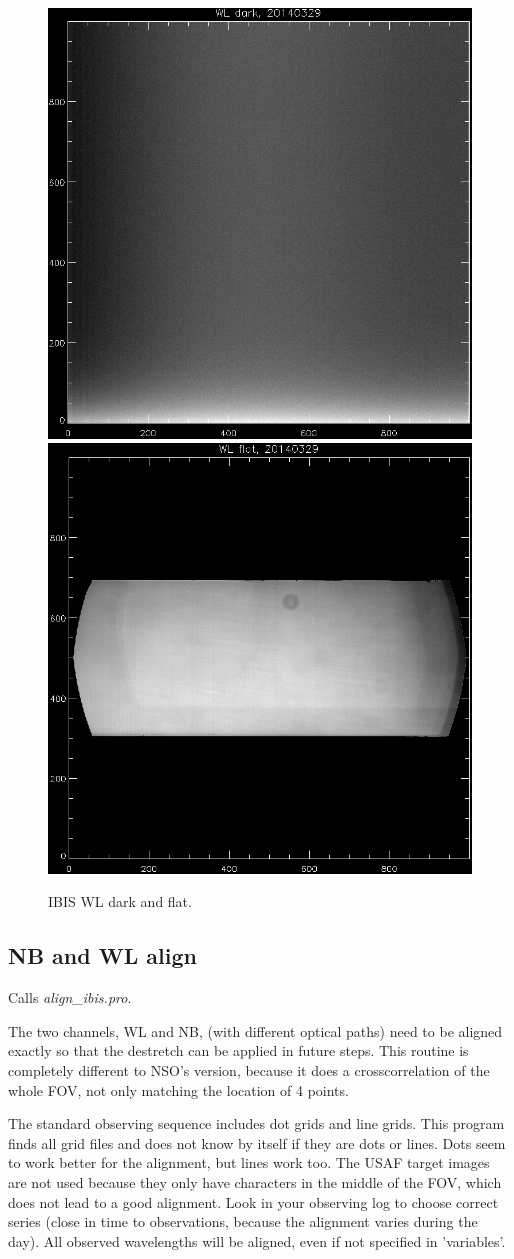 \documentclass[a4paper,11pt]{article}
\begin{document}
\begin{figure}[!htb]
\begin{centering}
\includegraphics[width=.45\textwidth]{ibiswldark.png}
\includegraphics[width=.45\textwidth]{ibiswlflat.png}
\caption{IBIS WL dark and flat.\label{figwl}}
\end{centering}
\end{figure}


\subsection{NB and WL align}
Calls \textit{align\_ibis.pro}.


The two channels, WL and NB, (with different optical paths) need to be aligned exactly so that the destretch can be applied in future steps. This routine is completely different to NSO's version, because it does a crosscorrelation of the whole FOV, not only matching the location of 4 points.

The standard observing sequence includes dot grids and line grids. This program finds all grid files and  does not know by itself if they are dots or lines. Dots seem to work better for the alignment, but lines work too. The USAF target images are not used because they only have characters in the middle of the FOV, which does not lead to a good alignment. Look in your observing log to choose correct series (close in time to observations, because the alignment varies during the day). All observed wavelengths will be aligned, even if not specified in 'variables'.
\end{document}
